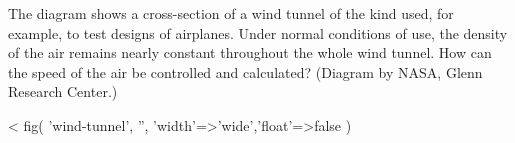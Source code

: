 The diagram shows a cross-section of a wind tunnel of the kind used, for example,
        to test designs of airplanes. Under normal conditions of use, the density of the air
        remains nearly constant throughout the whole wind tunnel. How can the speed of
        the air be controlled and calculated? (Diagram by NASA, Glenn Research Center.)

<%
  fig(
    'wind-tunnel',
    '',
    {'width'=>'wide','float'=>false}
  )

